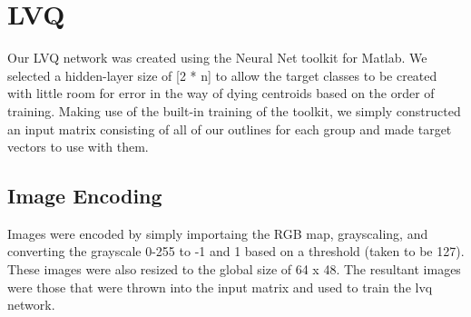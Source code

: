 \documentclass{article}
\begin{document}
\section{LVQ}
Our LVQ network was created using the Neural Net toolkit for Matlab. We selected a hidden-layer size of [2 * n] to allow the target classes to be created with little room for error in the way of dying centroids based on the order of training. Making use of the built-in training of the toolkit, we simply constructed an input matrix consisting of all of our outlines for each group and made target vectors to use with them. 
\subsection{Image Encoding}
Images were encoded by simply importaing the RGB map, grayscaling, and converting the grayscale 0-255 to -1 and 1 based on a threshold (taken to be 127). These images were also resized to the global size of 64 x 48. The resultant images were those that were thrown into the input matrix and used to train the lvq network.
\end{document}
